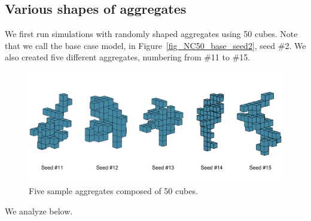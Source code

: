 \subsection{Various shapes of aggregates}
We first run simulations with randomly shaped aggregates using 50 cubes. Note that we call the base case model, in Figure~\ref{fig_NC50_base_seed2}, seed \#2. We also created five different aggregates, numbering from \#11 to \#15. 
\begin{figure}[ht]
	\begin{center}
		\includegraphics[scale=0.4]{./figures/fig_seed11_15_all.pdf}
	\caption{Five sample aggregates composed of 50 cubes.}
	\label{fig_seed11_15_all}
\end{center}
\end{figure}
We analyze below.
